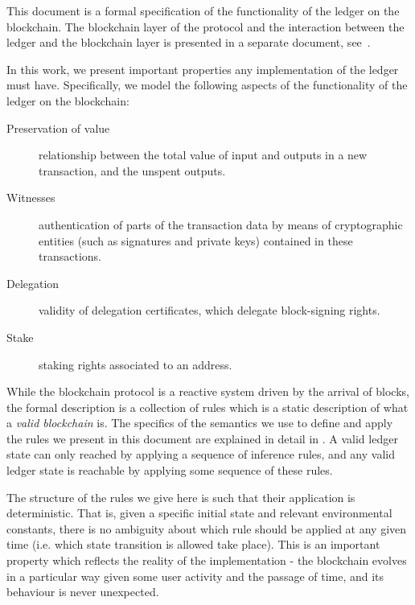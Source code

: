 This document is a formal specification of the functionality of the ledger
on the blockchain. The blockchain layer of the
protocol and the interaction between the ledger and the blockchain
layer is presented in a separate document, see~\cite{}.

In this work,
we present important properties any implementation of the ledger must have.
Specifically, we model the following aspects
of the functionality of the ledger on the blockchain:

\begin{description}
\item[Preservation of value] relationship between the total value of input and
  outputs in a new transaction, and the unspent outputs.
\item[Witnesses] authentication of parts of the transaction data by means of
  cryptographic entities (such as signatures and private keys) contained in
  these transactions.
\item[Delegation] validity of delegation certificates, which delegate
  block-signing rights.
\item[Stake] staking rights associated to an address.
\end{description}

While the blockchain protocol is a reactive system driven by the arrival
of blocks, the formal description is a collection of rules which is a
static description of what a \textit{valid blockchain} is. The specifics of the
semantics we use to define and apply
the rules we present in this document are explained in detail in
\cite{small_step_semantics}. A valid ledger state can only
reached by applying a sequence of inference rules, and any valid ledger state
is reachable by applying some sequence of these rules.

The structure of the rules we give here is such that their application is
deterministic. That is, given a specific initial state and relevant environmental
constants, there is no ambiguity
about which rule should be applied at any given time (i.e. which state
transition is allowed take place). This is an important property which reflects
the reality of the implementation - the blockchain evolves in a particular way
given some user activity and the passage of time, and its behaviour is
never unexpected.
